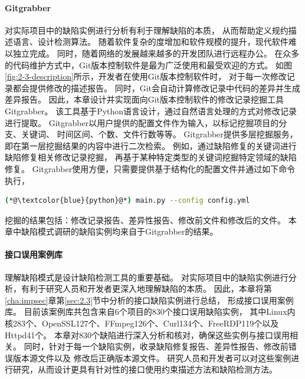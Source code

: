 \paragraph{Gitgrabber}
对实际项目中的缺陷实例进行分析有利于理解缺陷的本质，
从而帮助定义规约描述语言、设计检测算法。
随着软件复杂的度增加和软件规模的提升，现代软件难以独立完成。
同时，随着网络的发展越来越多的开发团队进行远程办公。
在众多的代码维护方式中，Git版本控制软件是最为广泛使用和最受欢迎的方式。
如图\ref{fig:2-3-description}所示，开发者在使用Git版本控制软件时，
对于每一次修改记录都会提供修改的描述报告。
同时，Git会自动计算修改记录中代码的差异并生成差异报告。
因此，本章设计并实现面向Git版本控制软件的修改记录挖掘工具Gitgrabber。
该工具基于Python语言设计，通过自然语言处理的方式对修改记录进行提取。
Gitgrabber以用户提供的配置文件作为输入，以标记挖掘项目的分支、关键词、
时间区间、个数、文件行数等等。
Gitgrabber提供多层挖掘服务，即在第一层挖掘结果的内容中进行二次检索。
例如，通过缺陷修复的关键词进行缺陷修复相关修改记录挖掘，
再基于某种特定类型的关键词挖掘特定领域的缺陷修复。
Gitgrabber使用方便，只需要提供基于结构化的配置文件并通过如下命令执行，
\begin{lstlisting}[language={bash},
basicstyle=\linespread{0.8}\listingsfont,
numbers=none,
xleftmargin=.3\textwidth]
(*@\textcolor{blue}{python}@*) main.py --config config.yml
\end{lstlisting}
挖掘的结果包括：修改记录报告、差异性报告、修改前文件和修改后的文件。
本章中缺陷模式调研的缺陷实例均来自于Gitgrabber的结果。

\paragraph{接口误用案例库}
理解缺陷模式是设计缺陷检测工具的重要基础。
对实际项目中的缺陷实例进行分析，有利于研究人员和开发者更深入地理解缺陷的本质。
因此，本章将第\ref{cha:impsec}章第\ref{sec:2.3}节中分析的接口缺陷实例进行总结，
形成接口误用案例库。
目前该案例库共包含来自6个项目的830个接口误用缺陷实例，
其中Linux内核283个、OpenSSL127个、FFmpeg126个、Curl134个、FreeRDP119个以及Httpd41个。
本章对830个缺陷进行深入分析和核对，确保这些实例与接口误用相关。
同时，针对于每一个缺陷实例，收录缺陷修复报告、差异性报告、修改前错误版本源文件以及
修改后正确版本源文件。
研究人员和开发者可以对这些案例进行研究，从而设计更具有针对性的接口使用约束描述方法和缺陷检测方法。

